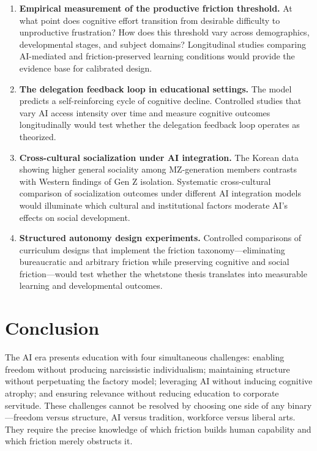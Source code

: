 \documentclass[12pt]{article}
\begin{document}
\begin{enumerate}[leftmargin=*]
    \item \textbf{Empirical measurement of the productive friction threshold.} At what point does cognitive effort transition from desirable difficulty to unproductive frustration? How does this threshold vary across demographics, developmental stages, and subject domains? Longitudinal studies comparing AI-mediated and friction-preserved learning conditions would provide the evidence base for calibrated design.
    \item \textbf{The delegation feedback loop in educational settings.} The \citet{CognitiveDivergence2026} model predicts a self-reinforcing cycle of cognitive decline. Controlled studies that vary AI access intensity over time and measure cognitive outcomes longitudinally would test whether the delegation feedback loop operates as theorized.
    \item \textbf{Cross-cultural socialization under AI integration.} The Korean data showing higher general sociality among MZ-generation members contrasts with Western findings of Gen Z isolation. Systematic cross-cultural comparison of socialization outcomes under different AI integration models would illuminate which cultural and institutional factors moderate AI's effects on social development.
    \item \textbf{Structured autonomy design experiments.} Controlled comparisons of curriculum designs that implement the friction taxonomy---eliminating bureaucratic and arbitrary friction while preserving cognitive and social friction---would test whether the whetstone thesis translates into measurable learning and developmental outcomes.
\end{enumerate}

\section{Conclusion}
\label{sec:conclusion}

The AI era presents education with four simultaneous challenges: enabling freedom without producing narcissistic individualism; maintaining structure without perpetuating the factory model; leveraging AI without inducing cognitive atrophy; and ensuring relevance without reducing education to corporate servitude. These challenges cannot be resolved by choosing one side of any binary---freedom versus structure, AI versus tradition, workforce versus liberal arts. They require the precise knowledge of which friction builds human capability and which friction merely obstructs it.
\end{document}
